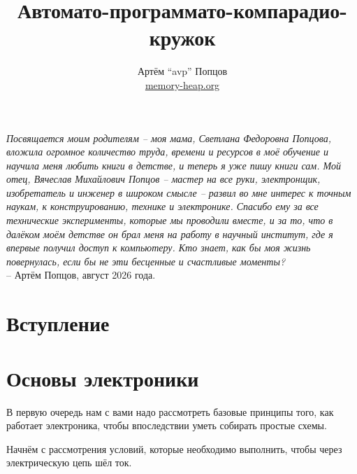 \documentclass[a4paper,twoside]{book}
\title{Автомато-программато-компарадио-кружок}
\author{Артём ``avp'' Попцов\\\href{https://memory-heap.org}{memory-heap.org}}
\begin{document}
\maketitle

\tableofcontents

\newpage
\vspace*{\fill}

\noindent
\begin{minipage}{0.48\textwidth}
  \mbox{}
\end{minipage}
\hfill
\begin{minipage}{0.48\textwidth}
  \emph{Посвящается моим родителям -- моя мама, Светлана Федоровна Попцова,
  вложила огромное количество труда, времени и ресурсов в моё обучение и научила
  меня любить книги в детстве, и теперь я уже пишу книги сам.  Мой отец,
  Вячеслав Михайлович Попцов -- мастер на все руки, электронщик, изобретатель и
  инженер в широком смысле -- развил во мне интерес к точным наукам, к
  конструированию, технике и электронике.  Спасибо ему за все технические
  эксперименты, которые мы проводили вместе, и за то, что в далёком моём детстве
  он брал меня на работу в научный институт, где я впервые получил доступ к
  компьютеру.  Кто знает, как бы моя жизнь повернулась, если бы не эти бесценные
  и счастливые моменты?} \\
  -- Артём Попцов, август 2026 года.
\end{minipage}

\vspace*{\fill}

\chapter*{Вступление}



\chapter{Основы электроники}

В первую очередь нам с вами надо рассмотреть базовые принципы того, как работает
электроника, чтобы впоследствии уметь собирать простые схемы.

Начнём с рассмотрения условий, которые необходимо выполнить, чтобы через
электрическую цепь шёл ток.
\end{document}
